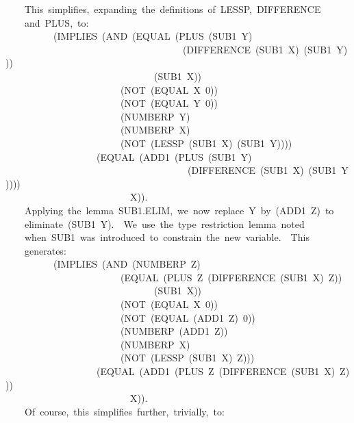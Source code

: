 \documentclass[11pt]{book}
\newenvironment{pubasis}{\begin{flushleft}\ttfamily\small}{\normalsize\rmfamily\end{flushleft}}
\begin{document}
\begin{pubasis}
~~~~This~simplifies,~expanding~the~definitions~of~LESSP,~DIFFERENCE\\
~~~~and~PLUS,~to:\\

~~~~~~~~~~(IMPLIES~(AND~(EQUAL~(PLUS~(SUB1~Y)\\
~~~~~~~~~~~~~~~~~~~~~~~~~~~~~~~~~~~~~(DIFFERENCE~(SUB1~X)~(SUB1~Y)))\\
~~~~~~~~~~~~~~~~~~~~~~~~~~~~~~~(SUB1~X))\\
~~~~~~~~~~~~~~~~~~~~~~~~(NOT~(EQUAL~X~0))\\
~~~~~~~~~~~~~~~~~~~~~~~~(NOT~(EQUAL~Y~0))\\
~~~~~~~~~~~~~~~~~~~~~~~~(NUMBERP~Y)\\
~~~~~~~~~~~~~~~~~~~~~~~~(NUMBERP~X)\\
~~~~~~~~~~~~~~~~~~~~~~~~(NOT~(LESSP~(SUB1~X)~(SUB1~Y))))\\
~~~~~~~~~~~~~~~~~~~(EQUAL~(ADD1~(PLUS~(SUB1~Y)\\
~~~~~~~~~~~~~~~~~~~~~~~~~~~~~~~~~~~~~~(DIFFERENCE~(SUB1~X)~(SUB1~Y))))\\
~~~~~~~~~~~~~~~~~~~~~~~~~~X)).\\

~~~~Applying~the~lemma~SUB1.ELIM,~we~now~replace~Y~by~(ADD1~Z)~to\\
~~~~eliminate~(SUB1~Y).~~We~use~the~type~restriction~lemma~noted\\
~~~~when~SUB1~was~introduced~to~constrain~the~new~variable.~~This\\
~~~~generates:\\

~~~~~~~~~~(IMPLIES~(AND~(NUMBERP~Z)\\
~~~~~~~~~~~~~~~~~~~~~~~~(EQUAL~(PLUS~Z~(DIFFERENCE~(SUB1~X)~Z))\\
~~~~~~~~~~~~~~~~~~~~~~~~~~~~~~~(SUB1~X))\\
~~~~~~~~~~~~~~~~~~~~~~~~(NOT~(EQUAL~X~0))\\
~~~~~~~~~~~~~~~~~~~~~~~~(NOT~(EQUAL~(ADD1~Z)~0))\\
~~~~~~~~~~~~~~~~~~~~~~~~(NUMBERP~(ADD1~Z))\\
~~~~~~~~~~~~~~~~~~~~~~~~(NUMBERP~X)\\
~~~~~~~~~~~~~~~~~~~~~~~~(NOT~(LESSP~(SUB1~X)~Z)))\\
~~~~~~~~~~~~~~~~~~~(EQUAL~(ADD1~(PLUS~Z~(DIFFERENCE~(SUB1~X)~Z)))\\
~~~~~~~~~~~~~~~~~~~~~~~~~~X)).\\

~~~~Of~course,~this~simplifies~further,~trivially,~to:\\


\end{pubasis}
\end{document}
